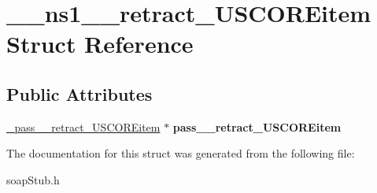\hypertarget{struct____ns1____retract__USCOREitem}{
\section{\_\-\_\-ns1\_\-\_\-retract\_\-USCOREitem Struct Reference}
\label{struct____ns1____retract__USCOREitem}
}
\subsection*{Public Attributes}
\begin{DoxyCompactItemize}
\item 
\hypertarget{struct____ns1____retract__USCOREitem_a96058c70b35233a06bcb0257d017b19d}{
\hyperlink{class__pass____retract__USCOREitem}{\_\-pass\_\-\_\-retract\_\-USCOREitem} $\ast$ {\bfseries pass\_\-\_\-retract\_\-USCOREitem}}
\label{struct____ns1____retract__USCOREitem_a96058c70b35233a06bcb0257d017b19d}

\end{DoxyCompactItemize}


The documentation for this struct was generated from the following file:\begin{DoxyCompactItemize}
\item 
soapStub.h\end{DoxyCompactItemize}
